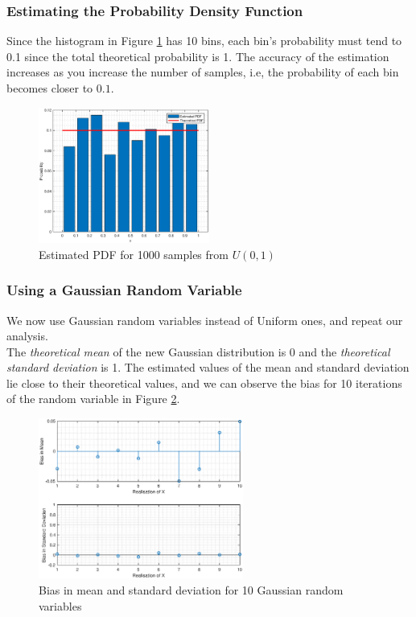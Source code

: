 \documentclass{article}
\begin{document}
\subsubsection{Estimating the Probability Density Function}
\label{sec:1.1.4}

Since the histogram in Figure \ref{fig:pdf_norm} has 10 bins, each bin's probability must tend to 0.1 since the total theoretical probability is 1. The accuracy of the estimation increases as you increase the number of samples, i.e, the probability of each bin becomes closer to $0.1$.

\begin{figure}[h!]
\centering
\includegraphics[width=0.5\textwidth]{pdf_norm}
\caption{\label{fig:pdf_norm} Estimated PDF for 1000 samples from $U(0,1)$}
\end{figure}


\subsubsection{Using a Gaussian Random Variable}

We now use Gaussian random variables instead of Uniform ones, and repeat our analysis.\\

The \textit{theoretical mean} of the new Gaussian distribution is 0 and the \textit{theoretical standard deviation} is 1. The estimated values of the mean and standard deviation lie close to their theoretical values, and we can observe the bias for 10 iterations of the random variable in Figure \ref{fig:bias_gaussian}.\\

\begin{figure}[h!]
\centering
\includegraphics[width=0.6\textwidth]{bias_gaussian}
\caption{\label{fig:bias_gaussian} Bias in mean and standard deviation for 10 Gaussian random variables}
\end{figure}
\end{document}
